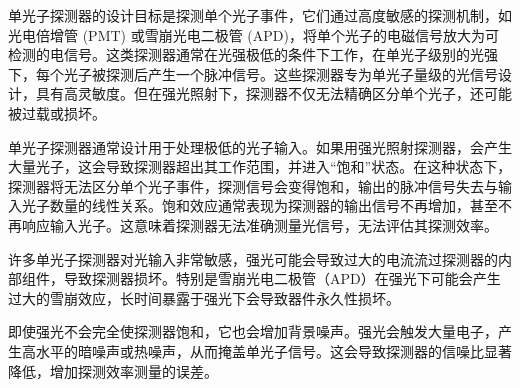 单光子探测器的设计目标是探测单个光子事件，它们通过高度敏感的探测机制，如光电倍增管 (PMT) 或雪崩光电二极管 (APD)，将单个光子的电磁信号放大为可检测的电信号。这类探测器通常在光强极低的条件下工作，在单光子级别的光强下，每个光子被探测后产生一个脉冲信号。这些探测器专为单光子量级的光信号设计，具有高灵敏度。但在强光照射下，探测器不仅无法精确区分单个光子，还可能被过载或损坏。

单光子探测器通常设计用于处理极低的光子输入。如果用强光照射探测器，会产生大量光子，这会导致探测器超出其工作范围，并进入“饱和”状态。在这种状态下，探测器将无法区分单个光子事件，探测信号会变得饱和，输出的脉冲信号失去与输入光子数量的线性关系。饱和效应通常表现为探测器的输出信号不再增加，甚至不再响应输入光子。这意味着探测器无法准确测量光信号，无法评估其探测效率。

许多单光子探测器对光输入非常敏感，强光可能会导致过大的电流流过探测器的内部组件，导致探测器损坏。特别是雪崩光电二极管（APD）在强光下可能会产生过大的雪崩效应，长时间暴露于强光下会导致器件永久性损坏。

即使强光不会完全使探测器饱和，它也会增加背景噪声。强光会触发大量电子，产生高水平的暗噪声或热噪声，从而掩盖单光子信号。这会导致探测器的信噪比显著降低，增加探测效率测量的误差。

